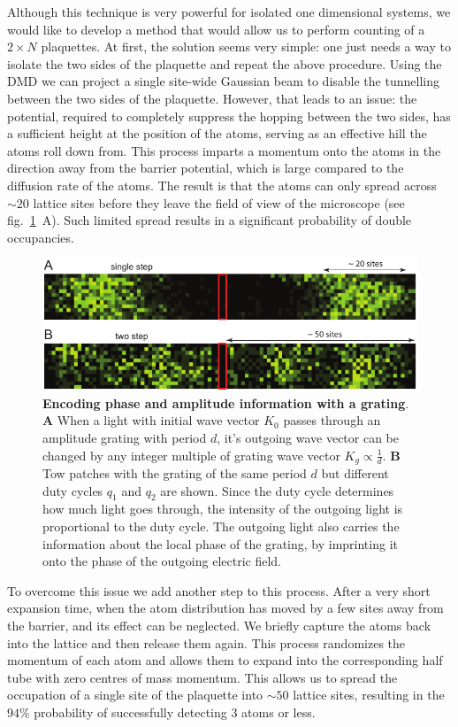 Although this technique is very powerful for isolated one dimensional systems, we would like to develop a method that would allow us to perform counting of a $2\times N$ plaquettes. At first, the solution seems very simple: one just needs a way to isolate the two sides of the plaquette and repeat the above procedure. Using the DMD we can project a single site-wide Gaussian beam to disable the tunnelling between the two sides of the plaquette. However, that leads to an issue: the potential, required to completely suppress the hopping between the two sides, has a sufficient height at the position of the atoms, serving as an effective hill the atoms roll down from. This process imparts a momentum onto the atoms in the direction away from the barrier potential, which is large compared to the diffusion rate of the atoms. The result is that the atoms can only spread across $\sim 20$ lattice sites before they leave the field of view of the microscope (see fig.~\ref{fig:CTE_expansion}~A). Such limited spread results in a significant probability of double occupancies.

\begin{figure}[t]
	\centering
	\includegraphics[scale=1]{figures/CTE_expansion.pdf}
	\caption{{\bf Encoding phase and amplitude information with a grating}. {\bf A} When a light with initial wave vector $K_0$ passes through an amplitude grating with period $d$, it's outgoing wave vector can be changed by any integer multiple of grating wave vector $K_g\propto \frac{1}{d}$. {\bf B} Tow patches with the grating of the same period $d$ but different duty cycles $q_1$ and $q_2$ are shown. Since the duty cycle determines how much light goes through, the intensity of the outgoing light is proportional to the duty cycle. The outgoing light also carries the information about the local phase of the grating, by imprinting it onto the phase of the outgoing electric field.}
	\label{fig:CTE_expansion}
\end{figure}

To overcome this issue we add another step to this process. After a very short expansion time, when the atom distribution has moved by a few sites away from the barrier, and its effect can be neglected. We briefly capture the atoms back into the lattice and then release them again. This process randomizes the momentum of each atom and allows them to expand into the corresponding half tube with zero centres of mass momentum. This allows us to spread the occupation of a single site of the plaquette into $\sim 50$ lattice sites, resulting in the $94\%$ probability of successfully detecting $3$ atoms or less. 